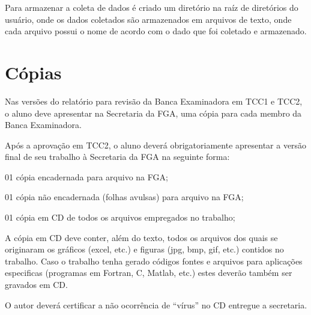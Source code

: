 Para armazenar a coleta de dados é criado um diretório na raíz de diretórios
do usuário, onde os dados coletados são
armazenados em arquivos de texto, onde cada arquivo possui o nome de acordo
com o dado que foi coletado e armazenado.

\section{Cópias}

Nas versões do relatório para revisão da Banca Examinadora em TCC1 e TCC2,
o aluno deve apresentar na Secretaria da FGA, uma cópia para cada membro da
Banca Examinadora.

Após a aprovação em TCC2, o aluno deverá obrigatoriamente apresentar a
versão final de seu trabalho à Secretaria da FGA na seguinte forma:

\begin{description}
	\item 01 cópia encadernada para arquivo na FGA;
	\item 01 cópia não encadernada (folhas avulsas) para arquivo na FGA;
	\item 01 cópia em CD de todos os arquivos empregados no trabalho;
\end{description}

A cópia em CD deve conter, além do texto, todos os arquivos dos quais se
originaram os gráficos (excel, etc.) e figuras (jpg, bmp, gif, etc.)
contidos no trabalho. Caso o trabalho tenha gerado códigos fontes e
arquivos para aplicações especificas (programas em Fortran, C, Matlab,
etc.) estes deverão também ser gravados em CD.

O autor deverá certificar a não ocorrência de “vírus” no CD entregue a
secretaria.

